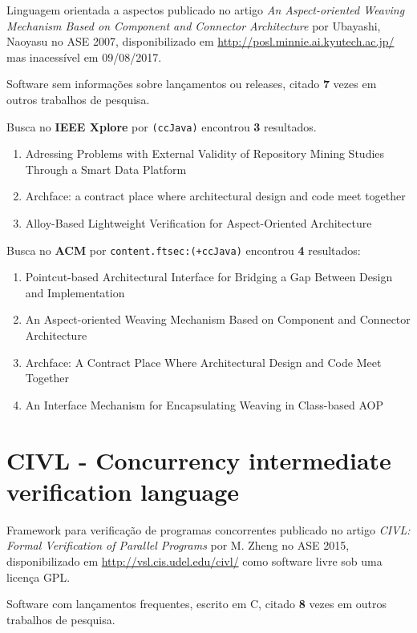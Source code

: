 Linguagem orientada a aspectos
publicado no artigo {\it An Aspect-oriented Weaving Mechanism Based on Component and Connector Architecture}
por Ubayashi, Naoyasu
no ASE 2007,
disponibilizado em \url{http://posl.minnie.ai.kyutech.ac.jp/}
mas inacessível em 09/08/2017.

Software sem informações sobre lançamentos ou releases,
citado {\bf 7} vezes em outros trabalhos de pesquisa.

Busca no {\bf IEEE Xplore} por
\texttt{(ccJava)}
encontrou {\bf 3}
resultados.

\begin{enumerate}
\item Adressing Problems with External Validity of Repository Mining Studies Through a Smart Data Platform
\item Archface: a contract place where architectural design and code meet together
\item Alloy-Based Lightweight Verification for Aspect-Oriented Architecture
\end{enumerate}

Busca no {\bf ACM} por
\texttt{content.ftsec:(+ccJava)}
encontrou {\bf 4}
resultados:

\begin{enumerate}
\item Pointcut-based Architectural Interface for Bridging a Gap Between Design and Implementation
\item An Aspect-oriented Weaving Mechanism Based on Component and Connector Architecture
\item Archface: A Contract Place Where Architectural Design and Code Meet Together
\item An Interface Mechanism for Encapsulating Weaving in Class-based AOP
\end{enumerate}

\section{CIVL - Concurrency intermediate verification language}

Framework para verificação de programas concorrentes
publicado no artigo {\it CIVL: Formal Verification of Parallel Programs}
por M. Zheng
no ASE 2015,
disponibilizado em \url{http://vsl.cis.udel.edu/civl/}
como software livre
sob uma licença GPL.

Software com lançamentos frequentes,
escrito em C,
citado {\bf 8} vezes em outros trabalhos de pesquisa.

